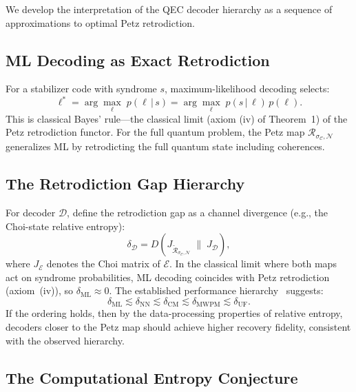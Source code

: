\documentclass[prl,twocolumn,superscriptaddress,longbibliography]{revtex4-2}
\newcommand{\Petz}{\mathcal{R}}
\newcommand{\chan}{\mathcal{N}}
\newcommand{\code}{\mathcal{C}}
\begin{document}
We develop the interpretation of the QEC decoder hierarchy as a
sequence of approximations to optimal Petz retrodiction.

\subsection{ML Decoding as Exact Retrodiction}

For a stabilizer code with syndrome $s$, maximum-likelihood decoding
selects:
\begin{equation}
\ell^* = \arg\max_\ell \; p(\ell \,|\, s)
= \arg\max_\ell \; p(s \,|\, \ell)\, p(\ell).
\end{equation}
This is classical Bayes' rule---the classical limit (axiom (iv) of
Theorem~1) of the Petz retrodiction functor. For the full quantum
problem, the Petz map $\Petz_{\sigma_\code,\chan}$ generalizes ML
by retrodicting the full quantum state including coherences.

\subsection{The Retrodiction Gap Hierarchy}

For decoder $\mathcal{D}$, define the retrodiction gap as a
channel divergence (e.g., the Choi-state relative entropy):
\begin{equation}
\delta_{\mathcal{D}} = D\!\left(J_{\tilde{\Petz}_{\sigma_\code,\chan}}
  \;\big\|\; J_{\mathcal{D}}\right),
\end{equation}
where $J_{\mathcal{E}}$ denotes the Choi matrix of $\mathcal{E}$.
In the classical limit where both maps act on syndrome
probabilities, ML decoding coincides with Petz retrodiction
(axiom~(iv)), so $\delta_{\mathrm{ML}} \approx 0$.
The established performance hierarchy~\cite{deMartiOlius2024}
suggests:
\begin{equation}
\delta_{\mathrm{ML}}
\lesssim \delta_{\mathrm{NN}}
\lesssim \delta_{\mathrm{CM}}
\lesssim \delta_{\mathrm{MWPM}}
\lesssim \delta_{\mathrm{UF}}.
\end{equation}
If the ordering holds, then by the data-processing properties
of relative entropy, decoders closer to the Petz map should
achieve higher recovery fidelity, consistent with the observed
hierarchy.

\subsection{The Computational Entropy Conjecture}
\end{document}
